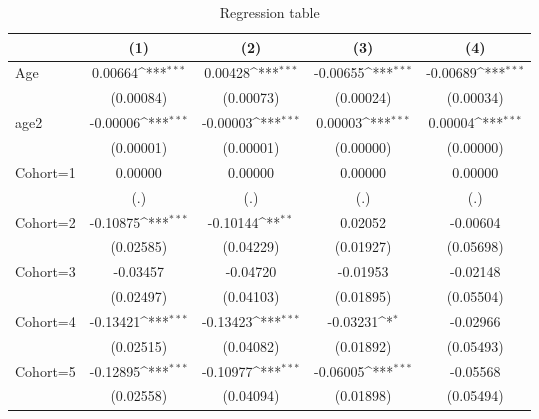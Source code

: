 \begin{table}[htbp]\centering
\def\sym#1{\ifmmode^{#1}\else\(^{#1}\)\fi}
\caption{Regression table \label{reg4}}
\begin{tabular}{l*{4}{c}}
\toprule
                    &\multicolumn{1}{c}{(1)}         &\multicolumn{1}{c}{(2)}         &\multicolumn{1}{c}{(3)}         &\multicolumn{1}{c}{(4)}         \\
\midrule
Age                 &     0.00664\sym{***}&     0.00428\sym{***}&    -0.00655\sym{***}&    -0.00689\sym{***}\\
                    &   (0.00084)         &   (0.00073)         &   (0.00024)         &   (0.00034)         \\
\addlinespace
age2                &    -0.00006\sym{***}&    -0.00003\sym{***}&     0.00003\sym{***}&     0.00004\sym{***}\\
                    &   (0.00001)         &   (0.00001)         &   (0.00000)         &   (0.00000)         \\
\addlinespace
Cohort=1            &     0.00000         &     0.00000         &     0.00000         &     0.00000         \\
                    &         (.)         &         (.)         &         (.)         &         (.)         \\
\addlinespace
Cohort=2            &    -0.10875\sym{***}&    -0.10144\sym{**} &     0.02052         &    -0.00604         \\
                    &   (0.02585)         &   (0.04229)         &   (0.01927)         &   (0.05698)         \\
\addlinespace
Cohort=3            &    -0.03457         &    -0.04720         &    -0.01953         &    -0.02148         \\
                    &   (0.02497)         &   (0.04103)         &   (0.01895)         &   (0.05504)         \\
\addlinespace
Cohort=4            &    -0.13421\sym{***}&    -0.13423\sym{***}&    -0.03231\sym{*}  &    -0.02966         \\
                    &   (0.02515)         &   (0.04082)         &   (0.01892)         &   (0.05493)         \\
\addlinespace
Cohort=5            &    -0.12895\sym{***}&    -0.10977\sym{***}&    -0.06005\sym{***}&    -0.05568         \\
                    &   (0.02558)         &   (0.04094)         &   (0.01898)         &   (0.05494)         \\

\end{tabular}
\end{table}

